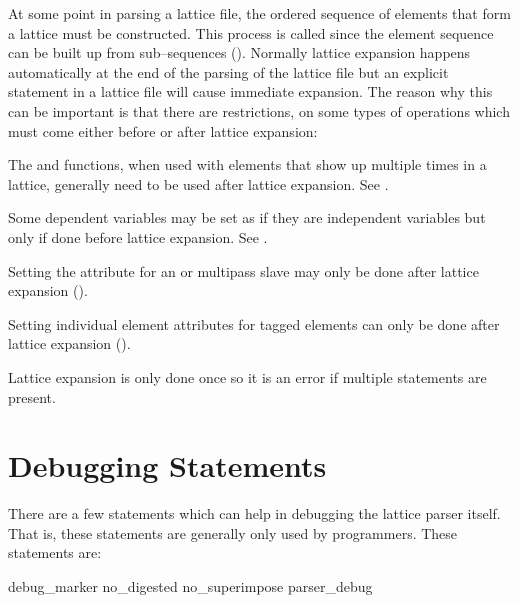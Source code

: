{{At some point in parsing a lattice file, the ordered sequence of
elements that form a lattice must be constructed. This process is called
 since the element sequence can be built up from
sub--sequences (). Normally lattice expansion happens
automatically at the end of the parsing of the lattice file but an
explicit  statement in a lattice file will cause
immediate expansion. The reason why this can be important is that there
are restrictions, on some types of operations which must come either
before or after lattice expansion:
\begin{Itemize}
\item 
{}
The  and  functions, when used with elements
that show up multiple times in a lattice, generally need to be used
after lattice expansion. See .
\item 
Some dependent variables may be set as if they are independent
variables but only if done before lattice expansion. See .
\item 
Setting the  attribute for an 
 or  multipass
slave may only be done after lattice expansion ().
\item
{}
Setting individual element attributes for tagged elements can only be done
after lattice expansion ().
\end{Itemize}

Lattice expansion is only done once so it is an error if multiple
 statements are present.

\section{Debugging Statements}
\label{s:debug}

There are a few statements
which can help in debugging the \bmad lattice parser
itself. That is, these statements are generally only used by programmers.
These statements are:
\begin{example}
  debug_marker
  no_digested
  no_superimpose
  parser_debug
\end{example}

}}
